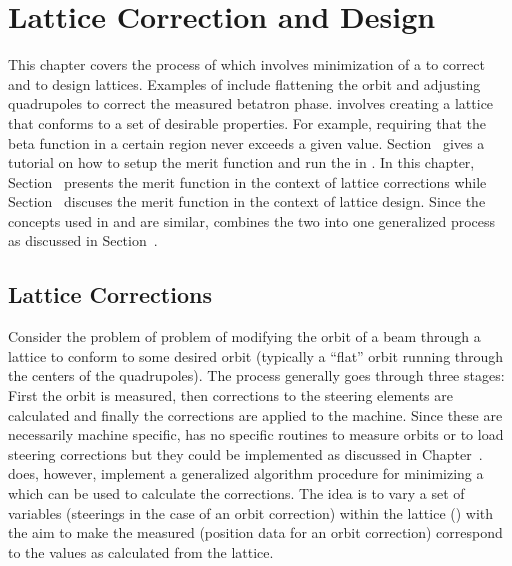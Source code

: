 \chapter{Lattice Correction and Design}
\label{c:opti}

This chapter covers the process of  which involves
minimization of a
 to correct and to design lattices. Examples
of  include flattening the orbit and adjusting
quadrupoles to correct the measured betatron phase.  involves creating a lattice that conforms to a set of
desirable properties. For example, requiring that the beta function
in a certain region never exceeds a given value.
Section~ gives a tutorial on how to setup the merit
function and run the  in \tao.  In this chapter,
Section~ presents the merit function in the
context of lattice corrections while Section~
discuses the merit function in the context of lattice design. Since
the concepts used in  and  are
similar, \tao combines the two into one generalized process as 
discussed in Section~.

\section{Lattice Corrections}
\label{s:lattice.correction}

Consider the problem of problem of modifying the orbit of a beam
through a lattice to conform to some desired orbit (typically a ``flat'' orbit
running through the centers of the quadrupoles). The process
generally goes through three stages: First the orbit is measured, then
corrections to the steering elements are calculated and finally the
corrections are applied to the machine. Since these are necessarily
machine specific, \tao has no specific routines to measure orbits or
to load steering corrections but they could be implemented as
discussed in Chapter~. \tao does, however,
implement a generalized algorithm procedure for minimizing a
 which can be used to calculate the corrections.
The idea is to vary a set of variables (steerings in the case of an
orbit correction) within the  lattice
() with the aim to make the measured 
(position data for an orbit correction) correspond to the
values as calculated from the  lattice.

